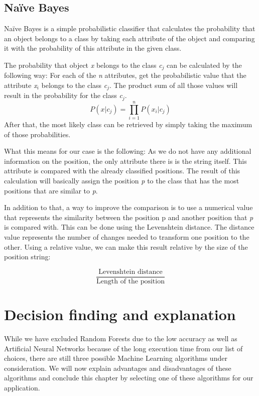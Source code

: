 \subsection{Na{\"i}ve Bayes}
\label{sec4.2.3}
Na{\"i}ve Bayes is a simple probabilistic classifier that calculates the probability that an object belongs to a class by taking each attribute of the object and comparing it with the probability of this attribute in the given class.

The probability that object \emph{x} belongs to the class \emph{c$_j$} can be calculated by the following way: For each of the \emph{n} attributes, get the probabilistic value that the attribute \emph{x$_i$} belongs to the class \emph{c$_j$}. The product sum of all those values will result in the probability for the class \emph{c$_j$}.
\[
P(x|c_j) = \prod\limits_{i=1}^n P(x_i|c_j)
\]
After that, the most likely class can be retrieved by simply taking the maximum of those probabilities.

What this means for our case is the following: As we do not have any additional information on the position, the only attribute there is is the string itself. This attribute is compared with the already classified positions. The result of this calculation will basically assign the position \emph{p} to the class that has the most positions that are similar to \emph{p}.

In addition to that, a way to improve the comparison is to use a numerical value that represents the similarity between the position \emph{}p and another position that \emph{p} is compared with. This can be done using the Levenshtein distance. The distance value represents the number of changes needed to transform one position to the other. Using a relative value, we can make this result relative by the size of the position string:

\[
\frac {\text{Levenshtein distance}}{\text{Length of the position}}
\]

\section{Decision finding and explanation}
\label{sec4.3}

While we have excluded Random Forests due to the low accuracy as well as Artificial Neural Networks because of the long execution time from our list of choices, there are still three possible Machine Learning algorithms under consideration. We will now explain advantages and disadvantages of these algorithms and conclude this chapter by selecting one of these algorithms for our application.

